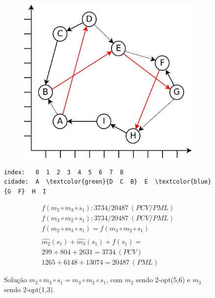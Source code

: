 \begin{figure}[ht]
    \begin{minipage}{.475\textwidth}
        \begin{subfigure}[t]{1\textwidth} %
            \includegraphics[width=1\linewidth]{figuras/pml/exemplo-rodolfo-2opt-1-3-5-6.png}
        \end{subfigure}
    \end{minipage}
    \begin{minipage}{.475\textwidth}
\begin{Verbatim}[commandchars=\\\{\}]
index:   0  1  2  3  4  5  6  7  8
cidade:  A  \textcolor{green}{D  C  B}  E  \textcolor{blue}{G  F}  H  I
\end{Verbatim}
\begin{gather*}
f(m_2 \circ m_3 \circ s_1): 3734/20487 \ (PCV/PML) \\
f(m_3 \circ m_2 \circ s_1): 3734/20487 \ (PCV/PML) \\
f(m_2 \circ m_3 \circ s_1) = f(m_3 \circ m_2 \circ s_1) \\ \\
\widehat{m_2}(s_1)+\widehat{m_3}(s_1)+f(s_1) = \\
299 + 804 + 2631 = 3734 \ (PCV) \\
1265+6148+13074=20487 \ (PML)
\end{gather*}
    \end{minipage}
    \caption{Solução $m_2 \circ m_3 \circ s_1 = m_3 \circ m_2 \circ s_1$, com $m_2$ sendo 2-opt(5,6) e $m_3$ sendo 2-opt(1,3).}
    \label{fig:figuraExemplo_m2m3s1}
\end{figure}

